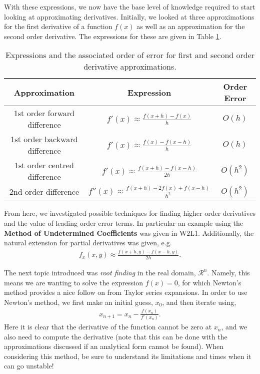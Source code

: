 \documentclass[11pt,a4paper]{report}
\begin{document}
	With these expressions, we now have the base level of knowledge required to start looking at approximating derivatives. Initially, we looked at three approximations for the first derivative of a function $f(x)$ as well as an approximation for the second order derivative. The expressions for these are given in Table \ref{tab:numDerivatives}.
	\begin{table}[h!]
		\caption{Expressions and the associated order of error for first and second order derivative approximations.} \label{tab:numDerivatives}
		\centering
		\begin{tabular}{c c c}
			\hline
			\textbf{Approximation}	&	\textbf{Expression}	& \textbf{Order Error} \\
			\hline
			1st order forward difference & $f'(x) \approx \frac{f(x+h) - f(x)}{h}$ & $O(h)$ \\[5pt]
			1st order backward difference & $f'(x) \approx \frac{f(x) - f(x-h)}{h}$ & $O(h)$ \\[5pt]
			1st order centred difference & $f'(x) \approx \frac{f(x+h) - f(x-h)}{2h}$ & $O(h^2)$ \\[5pt]
			2nd order difference & $f''(x) \approx \frac{f(x+h) - 2f(x) + f(x-h)}{h^2}$ & $O(h^2)$\\[5pt]
			\hline
		\end{tabular}
	\end{table}
	
	From here, we investigated possible techniques for finding higher order derivatives and the value of leading order error terms. In particular an example using the \textbf{Method of Undetermined Coefficients} was given in W2L1. Additionally, the natural extension for partial derivatives was given, e.g.
	\begin{align}
	f_x(x,y) \approx \frac{f(x+h,y) - f(x-h,y)}{2h}.
	\end{align}
	
	The next topic introduced was \textit{root finding} in the real domain, $\mathcal{R}^n$. Namely, this means we are wanting to solve the expression $f(x)=0$, for which Newton's method provides a nice follow on from Taylor series expansions. In order to use Newton's method, we first make an initial guess, $x_0$, and then iterate using,
	\begin{align}
	x_{n+1} = x_n - \frac{f(x_n)}{f'(x_n)}.
	\end{align}
	Here it is clear that the derivative of the function cannot be zero at $x_n$, and we also need to compute the derivative (note that this can be done with the approximations discussed if an analytical form cannot be found). When considering this method, be sure to understand its limitations and times when it can go unstable!
	
\end{document}
